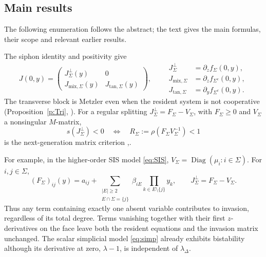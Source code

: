 \subsection{Main results}\label{s:mainRes}


The following enumeration follows the abstract; the text gives the main
formulas, their scope and relevant earlier results.
\begin{enumerate}
The siphon identity and positivity give
\[
 J(0,y)=\begin{pmatrix}
 J_\Sigma^\perp(y)&0\\
 J_{\mathrm{mix},\Sigma}(y)&J_{\mathrm{tan},\Sigma}(y)
 \end{pmatrix},\qquad
 \begin{aligned}
 J_\Sigma^\perp&=\partial_zf_\Sigma(0,y),\\
 J_{\mathrm{mix},\Sigma}&=\partial_zf_{\Sigma^c}(0,y),\\
 J_{\mathrm{tan},\Sigma}&=\partial_yf_{\Sigma^c}(0,y).
 \end{aligned}
\]
The transverse block is Metzler even when the resident system is not
cooperative (Proposition~\ref{p:Tri}, \cite{AAHK,AA26}). For a regular
splitting $J_\Sigma^\perp=F_\Sigma-V_\Sigma$, with
$F_\Sigma\ge0$ and $V_\Sigma$ a nonsingular $M$-matrix,
\[
 s(J_\Sigma^\perp)<0
 \quad\Longleftrightarrow\quad
 R_\Sigma:=\rho(F_\Sigma V_\Sigma^{-1})<1
\]
is the next-generation matrix criterion \cite{Diek},\newline \cite{Van}.

For example, in the higher-order SIS model \eqref{eq:SIS}, $V_\Sigma=\operatorname{Diag}(\mu_i:i\in\Sigma)$.
For $i,j\in\Sigma$,
\[
 (F_\Sigma)_{ij}(y)=a_{ij}+
 \sum_{\substack{|E|\ge2\\E\cap\Sigma=\{j\}}}
 \beta_{iE}\prod_{k\in E\setminus\{j\}}y_k,
 \qquad J_\Sigma^\perp=F_\Sigma-V_\Sigma.
\]
Thus any term containing exactly one absent variable contributes to
invasion, regardless of its total degree. Terms vanishing together
with their first $z$-derivatives on the face leave both the resident
equations and the invasion matrix unchanged.
The scalar simplicial model \eqref{eq:simp} already exhibits bistability although its derivative at zero,
$\lambda-1$, is independent of $\lambda_\Delta$.


\end{enumerate}
